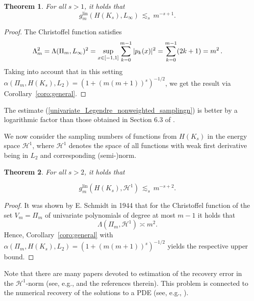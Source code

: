 \documentclass[a4paper,12pt]{amsart}
\newtheorem{theorem}{Theorem}
\theoremstyle{definition}
\theoremstyle{remark}
\newcommand{\lin}{\ensuremath{\mathrm{lin}}}
\begin{document}
{\begin{theorem}
For all  
$s>1$, it holds that 
\begin{equation}\label{univariate_Legendre_nonweighted_samplingn}
g_
{{m}}^{\lin}( H(K_s), 
L_{\infty})
 \,\lesssim_s\, 
m^{-s+1}.
\end{equation}
\end{theorem}
 {
\begin{proof}
 The Christoffel function satisfies
$$
\Lambda_m^2 = 
{\Lambda(\Pi_m, L_{\infty})^2}
=
\sup_{x\in [-1,1]} \sum_{
{k=0}}^{
{m-1}
} |p_k (x) |^2 =
\sum_{k=0}^{m-1} (2k+1) = m^2\,.
$$
Taking into account that in this setting 
$\alpha(\Pi_m,H(K_s), L_2) = (1+ (m(m+1))^s )^{-1/2}$,
we get the result via Corollary~\ref{coro:general}.
\end{proof}
}


The estimate (\ref{univariate_Legendre_nonweighted_samplingn}) is better by a logarithmic factor than those obtained in Section 6.3 of \cite{PU}. 


{
We now consider the sampling numbers of functions from $H(K_s)$ in the  {energy} space 
 {$\mathcal{H}^1$}, 
where 
 {$\mathcal{H}^1$}
denotes the space of all functions with weak first derivative being in $L_2$ and corresponding (semi-)norm. 



\begin{theorem}
For all %
$s>2$, it holds that %

\[
g_m^{\lin}( H(K_s), 
 {\mathcal{H}^1})
\,\lesssim_s\, 
m^{-s+2}.
\]
\end{theorem}
\begin{proof}
It was shown by E. Schmidt in 1944 \cite[Formula (13)]{Schmidt1944}
 {that} for the Christoffel function of the set $V_m = \Pi_m$ of univariate polynomials of degree
 {at most $m-1$}
it
 {holds that}
$$
\Lambda(\Pi_m,
 {\mathcal{H}^1}
) \asymp m^2.
$$
Hence,  {Corollary~\ref{coro:general}  with  $\alpha(\Pi_m,H(K_s), L_2) = (1+ (m(m+1))^s )^{-1/2}$ yields the respective upper bound.}
\end{proof}

 {Note that}
there are many papers devoted to estimation of the recovery error in the 
 {$\mathcal{H}^1$}-norm {(see, e.g., \cite{Byrenheid_Dung_Sickel_Ullrich,Griebel_Knapek2000,Griebel_Knapek2009} and the references therein)}. This problem is connected to the numerical recovery of the solutions to a PDE (see, e.g., \cite{Binev_Bonito_2023}).
}



}
\end{document}
